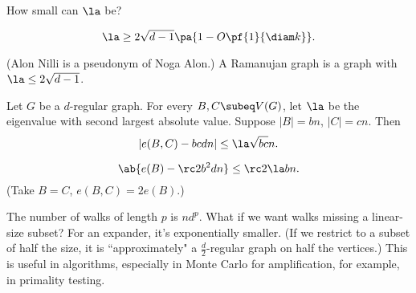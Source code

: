 How small can $\la$ be?
\begin{thm}
\[\la\ge 2\sqrt{d-1}\pa{1-O\pf{1}{\diam k}}.\]
\end{thm}
(Alon Nilli is a pseudonym of Noga Alon.) A Ramanujan graph is a graph with $\la\le 2\sqrt{d-1}$.
\begin{thm}
Let $G$ be a $d$-regular graph. 
For every $B,C\subeq V(G)$, let $\la$ be the eigenvalue with second largest absolute value. Suppose $|B|=bn$, $|C|=cn$. Then 
\[|e(B,C)-bcdn|\le \la\sqrt{bc}n.\]
\end{thm}
\begin{cor}
\[\ab{e(B)-\rc 2 b^2dn}\le \rc 2\la b n.\]
(Take $B=C$, $e(B,C)=2e(B)$.)
\end{cor}
The number of walks of length $p$ is $nd^p$. What if we want walks missing a linear-size subset? For an expander, it's exponentially smaller. (If we restrict to a subset of half the size, it is ``approximately" a $\frac d2$-regular graph on half the vertices.) This is useful in algorithms, especially in Monte Carlo for amplification, for example, in primality testing.


